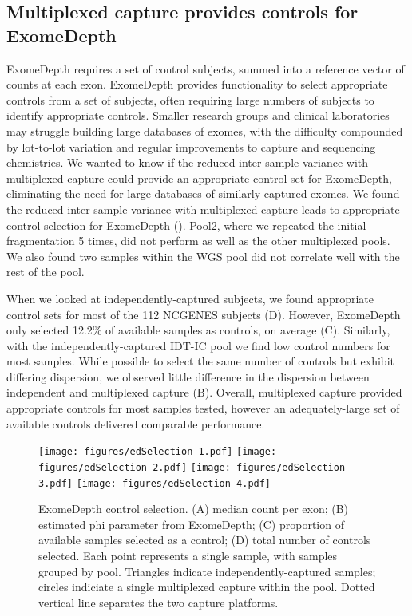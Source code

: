\documentclass{article}\usepackage[]{graphicx}\usepackage[]{color}
\begin{document}
\subsection{Multiplexed capture provides controls for ExomeDepth}

ExomeDepth requires a set of control subjects, summed into a reference vector of counts at each exon.
ExomeDepth provides functionality to select appropriate controls from a set of subjects, often requiring large numbers of subjects to identify appropriate controls.
Smaller research groups and clinical laboratories may struggle building large databases of exomes, with the difficulty compounded by lot-to-lot variation and regular improvements to capture and sequencing chemistries.
We wanted to know if the reduced inter-sample variance with multiplexed capture could provide an appropriate control set for ExomeDepth, eliminating the need for large databases of similarly-captured exomes.
We found the reduced inter-sample variance with multiplexed capture leads to appropriate control selection for ExomeDepth ().
Pool2, where we repeated the initial fragmentation 5 times, did not perform as well as the other multiplexed pools.
We also found two samples within the WGS pool did not correlate well with the rest of the pool.

When we looked at independently-captured subjects, we found appropriate control sets for most of the 112 NCGENES subjects (D).
However, ExomeDepth only selected 12.2\% of available samples as controls, on average (C).
Similarly, with the independently-captured IDT-IC pool we find low control numbers for most samples.
While possible to select the same number of controls but exhibit differing dispersion, we observed little difference in the dispersion between independent and multiplexed capture (B).
Overall, multiplexed capture provided appropriate controls for most samples tested, however an adequately-large set of available controls delivered comparable performance.

\begin{figure}
  \centering
  \texttt{[image: figures/edSelection-1.pdf]}%
  \texttt{[image: figures/edSelection-2.pdf]}
  \texttt{[image: figures/edSelection-3.pdf]}%
  \texttt{[image: figures/edSelection-4.pdf]}
  \caption{ExomeDepth control selection. (A) median count per exon; (B) estimated phi parameter from ExomeDepth; (C) proportion of available samples selected as a control; (D) total number of controls selected. Each point represents a single sample, with samples grouped by pool. Triangles indicate independently-captured samples; circles indiciate a single multiplexed capture within the pool. Dotted vertical line separates the two capture platforms.}
  \label{fig:edSelection}
\end{figure}
\end{document}
